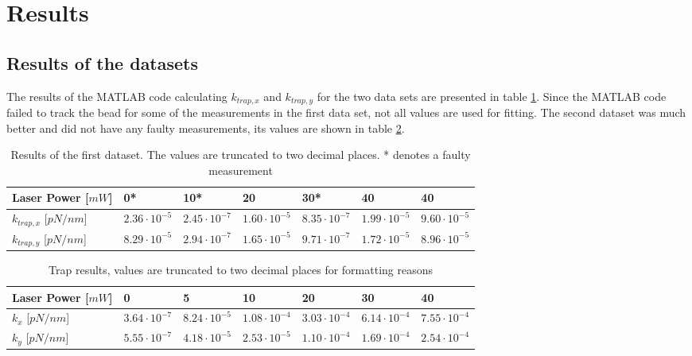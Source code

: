 \section{Results}
\subsection{Results of the datasets}
The results of the MATLAB code calculating $k_{trap,x}$ and $k_{trap,y}$ for the two data sets are presented in table \ref{tab:first-results}. Since the MATLAB code failed to track the bead for some of the measurements in the first data set, not all values are used for fitting. The second dataset was much better and did not have any faulty measurements, its values are shown in table \ref{tab:second-results}.\\

\vspace{-.2cm}
\begin{table}[h!]
\centering
\begin{tabular}{|l|l|l|l|l|l|l|}
\hline
Laser Power {[}$mW${]} & 0*         & 10*        & 20        & 30*        & 40         & 40        \\ \hline
$k_{trap,x}$    {[}$pN/nm${]}        & $2.36 \cdot 10^{-5}$ &$ 2.45 \cdot 10^{-7}$ & $1.60\cdot 10^{-5}$  & $8.35\cdot 10^{-7}$ & $1.99\cdot 10^{-5}$  & $9.60\cdot 10^{-5}$ \\ \hline
$k_{trap,y}$     {[}$pN/nm${]}       & $8.29 \cdot 10^{-5}$ &$ 2.94\cdot 10^{-7}$ & $1.65\cdot 10^{-5}$ & $9.71\cdot 10^{-7}$ & $1.72\cdot 10^{-5}$ & $8.96\cdot 10^{-5}$ \\ \hline
\end{tabular}
\caption{Results of the first dataset. The values are truncated to two decimal places. * denotes a faulty measurement}
\label{tab:first-results}
\end{table}


\vspace{-.2cm}
\begin{table}[h!]
\centering
    \begin{tabular}{|l|l|l|l|l|l|l|}
        \hline
        Laser Power {[}$mW${]} & 0         & 5         & 10         & 20         & 30         & 40         \\ \hline
        $k_x$     {[}$pN/nm${]}       & $3.64\cdot 10^{-7}$ & $8.24\cdot 10^{-5}$ & $1.08\cdot 10^{-4}$ & $3.03\cdot 10^{-4}$ & $6.14\cdot 10^{-4}$ & $7.55\cdot 10^{-4}$ \\ \hline
        $k_y$     {[}$pN/nm${]}       & $5.55\cdot 10^{-7}$   & $4.18\cdot 10^{-5}$ & $2.53\cdot 10^{-5}$  & $1.10\cdot 10^{-4}$ & $1.69\cdot 10^{-4}$ & $2.54\cdot 10^{-4}$ \\ \hline
    \end{tabular}
\caption{Trap results, values are truncated to two decimal places for formatting reasons}
\label{tab:second-results}
\end{table}

